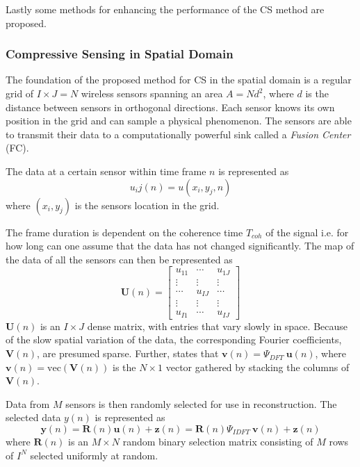 \documentclass[Main]{subfiles}
\begin{document}
		Lastly some methods for enhancing the performance of the CS method are proposed.
		
		\subsubsection{Compressive Sensing in Spatial Domain} %
		\label{sub:compressive_sensing_in_spatial_domain}

			The foundation of the proposed method for CS in the spatial domain is a regular grid of $I \times J = N$ wireless sensors spanning an area $A = Nd^2$, where $d$ is the distance between sensors in orthogonal directions.
			Each sensor knows its own position in the grid and can sample a physical phenomenon.
			The sensors are able to transmit their data to a computationally powerful sink called a \emph{Fusion Center} (FC).

			The data at a certain sensor within time frame $n$ is represented as
			\begin{equation}
				u_ij(n) = u(x_i, y_j, n)
			\end{equation}
			where $(x_i, y_j)$ is the sensors location in the grid.

			The frame duration is dependent on the coherence time $T_{coh}$ of the signal i.e. for how long can one assume that the data has not changed significantly.
			The map of the data of all the sensors can then be represented as
			\begin{equation}
				\mathbf{U}(n) =
			 	\begin{bmatrix}
			  		u_{11}	&	\cdots 	& 	u_{1J}	\\
			  		\vdots	&	\vdots	&	\vdots	\\
					\cdots 	& 	u_{IJ}	& 	\cdots 	\\
					\vdots	&	\vdots	&	\vdots	\\
					u_{I1} 	& 	\cdots 	& 	u_{IJ}
				\end{bmatrix}
				\label{eq:dataMap}
			\end{equation}
			$\mathbf{U}(n)$ is an $I \times J$ dense matrix, with entries that vary slowly in space.
			Because of the slow spatial variation of the data, the corresponding Fourier coefficients, $\mathbf{V}(n)$, are presumed sparse.
			Further, \cite{Fazel2011} states that $\mathbf{v}(n) = \Psi_{DFT}\ \mathbf{u}(n)$, where $\mathbf{v}(n) = \text{vec}(\mathbf{V}(n))$ is the $N \times 1$ vector gathered by stacking the columns of $\mathbf{V}(n)$.

			Data from $M$ sensors is then randomly selected for use in reconstruction.
			The selected data $y(n)$ is represented as
			\begin{equation}
				\mathbf{y}(n) = 
					\mathbf{R}(n) \mathbf{u}(n) + \mathbf{z}(n)
					= \mathbf{R}(n) \Psi_{IDFT}\ \mathbf{v}(n) + \mathbf{z}(n)
			\end{equation}
			where $\mathbf{R}(n)$ is an $M \times N$ random binary selection matrix consisting of $M$ rows of $I^N$ selected uniformly at random.
\end{document}

